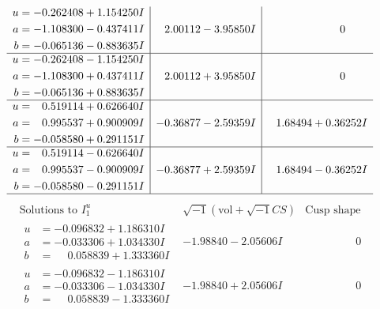 \documentclass[1p]{elsarticle_modified}
\theoremstyle{definition}
\newcommand{\I}{\sqrt{-1}}
\begin{document}
$$\begin{array}{c|c|c}
\begin{aligned}
u &= -0.262408 + 1.154250 I \\
a &= -1.108300 - 0.437411 I \\
b &= -0.065136 - 0.883635 I\end{aligned}
 & \phantom{-}2.00112 - 3.95850 I & \phantom{-0.000000 } 0 \\ \hline\begin{aligned}
u &= -0.262408 - 1.154250 I \\
a &= -1.108300 + 0.437411 I \\
b &= -0.065136 + 0.883635 I\end{aligned}
 & \phantom{-}2.00112 + 3.95850 I & \phantom{-0.000000 } 0 \\ \hline\begin{aligned}
u &= \phantom{-}0.519114 + 0.626640 I \\
a &= \phantom{-}0.995537 + 0.900909 I \\
b &= -0.058580 + 0.291151 I\end{aligned}
 & -0.36877 - 2.59359 I & \phantom{-}1.68494 + 0.36252 I \\ \hline\begin{aligned}
u &= \phantom{-}0.519114 - 0.626640 I \\
a &= \phantom{-}0.995537 - 0.900909 I \\
b &= -0.058580 - 0.291151 I\end{aligned}
 & -0.36877 + 2.59359 I & \phantom{-}1.68494 - 0.36252 I\\
 \hline 
 \end{array}$$\newpage$$\begin{array}{c|c|c}  
\text{Solutions to }I^u_{1}& \I (\text{vol} + \sqrt{-1}CS) & \text{Cusp shape}\\
 \hline 
\begin{aligned}
u &= -0.096832 + 1.186310 I \\
a &= -0.033306 + 1.034330 I \\
b &= \phantom{-}0.058839 + 1.333360 I\end{aligned}
 & -1.98840 - 2.05606 I & \phantom{-0.000000 } 0 \\ \hline\begin{aligned}
u &= -0.096832 - 1.186310 I \\
a &= -0.033306 - 1.034330 I \\
b &= \phantom{-}0.058839 - 1.333360 I\end{aligned}
 & -1.98840 + 2.05606 I & \phantom{-0.000000 } 0 \\ \hline\begin{aligned}

\end{aligned}
\end{array}$$
\end{document}
